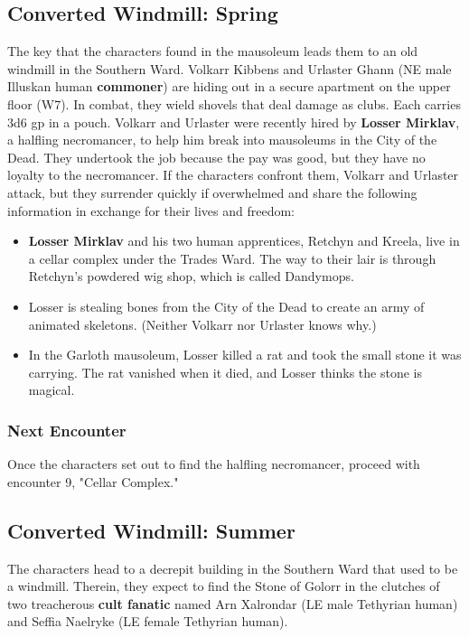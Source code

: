 \documentclass[10pt,a4paper,twoside,twocolumn,openany,nodeprecatedcode]{dndbook}
\begin{document}
\subsection{Converted Windmill: Spring}
The key that the characters found in the mausoleum leads them to an old windmill in the Southern Ward. Volkarr Kibbens and Urlaster Ghann (NE male Illuskan human \textbf{commoner}) are hiding out in a secure apartment on the upper floor (W7). In combat, they wield shovels that deal damage as clubs. Each carries 3d6 gp in a pouch.
Volkarr and Urlaster were recently hired by \textbf{Losser Mirklav}, a halfling necromancer, to help him break into mausoleums in the City of the Dead. They undertook the job because the pay was good, but they have no loyalty to the necromancer. If the characters confront them, Volkarr and Urlaster attack, but they surrender quickly if overwhelmed and share the following information in exchange for their lives and freedom:
\begin{itemize}

\item \textbf{Losser Mirklav} and his two human apprentices, Retchyn and Kreela, live in a cellar complex under the Trades Ward. The way to their lair is through Retchyn's powdered wig shop, which is called Dandymops.
\item Losser is stealing bones from the City of the Dead to create an army of animated skeletons. (Neither Volkarr nor Urlaster knows why.)
\item In the Garloth mausoleum, Losser killed a rat and took the small stone it was carrying. The rat vanished when it died, and Losser thinks the stone is magical.
\end{itemize}


\subsubsection{Next Encounter}
Once the characters set out to find the halfling necromancer, proceed with encounter 9, "Cellar Complex."
\subsection{Converted Windmill: Summer}
The characters head to a decrepit building in the Southern Ward that used to be a windmill. Therein, they expect to find the Stone of Golorr in the clutches of two treacherous \textbf{cult fanatic} named Arn Xalrondar (LE male Tethyrian human) and Seffia Naelryke (LE female Tethyrian human).
\end{document}
